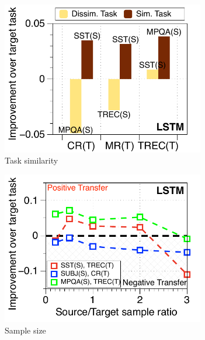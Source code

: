 \begin{figure}[!t]
	\centering
	\begin{subfigure}[b]{0.33\textwidth}
		\centering
		\includegraphics[width=0.975\textwidth]{figures/task_sim_norm_lstm.pdf}
		\caption{Task similarity}
		\label{fig_ab_sim}
	\end{subfigure}%
	\begin{subfigure}[b]{0.33\textwidth}
		\centering
		\includegraphics[width=0.975\textwidth]{figures/ratio_norm_3_pairs_lstm.pdf}
		\caption{Sample size}
		\label{fig_ab_data}
	\end{subfigure}
	\begin{subfigure}[b]{0.33\textwidth}
		\centering

\end{subfigure}
\end{figure}
